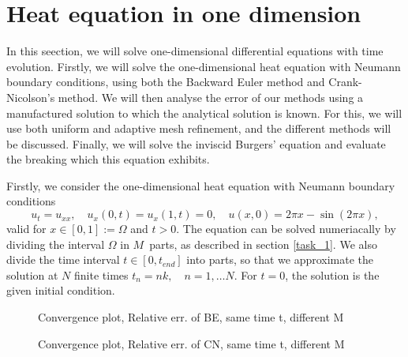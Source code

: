 \section{Heat equation in one dimension}
In this seection, we will solve one-dimensional differential equations with time evolution. 
Firstly, we will solve the one-dimensional heat equation with Neumann boundary conditions, using both the Backward Euler method and Crank-Nicolson's method.
We will then analyse the error of our methods using a manufactured solution to which the analytical solution is known.
For this, we will use both uniform and adaptive mesh refinement, and the different methods will be discussed.
Finally, we will solve the inviscid Burgers' equation and evaluate the breaking which this equation exhibits.

Firstly, we consider the one-dimensional heat equation with Neumann boundary conditions
\begin{equation*}
    u_t = u_{xx}, \quad u_x(0,t) = u_x(1,t) = 0, \quad u(x,0) = 2\pi x - \sin(2\pi x),
\end{equation*}
valid for $x \in [0,1] := \Omega$ and $t > 0$.
The equation can be solved numeriacally by dividing the interval $\Omega$ in $M$ parts, as described in section \ref{task_1}.
We also divide the time interval $t \in [0,t_{end}]$ into parts, so that we approximate the solution at $N$ finite times $t_n = nk, \quad n = 1, \ldots N$.
For $t = 0$, the solution is the given initial condition.


\begin{figure}[h]
    \centering
    
    \caption{Convergence plot, Relative err. of BE, same time t, different M}
\end{figure}

\begin{figure}[h]
    \centering
    
    \caption{Convergence plot, Relative err. of CN, same time t, different M}
\end{figure}
